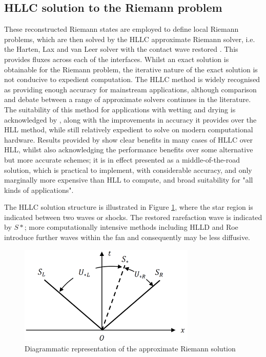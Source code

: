 \subsection{HLLC solution to the Riemann problem}

These reconstructed Riemann states are employed to define local Riemann problems, which are then solved by the HLLC approximate Riemann solver, i.e. the Harten, Lax and van Leer solver with the contact wave restored \citep{Toro1994}. This provides fluxes across each of the interfaces. Whilst an exact solution is obtainable for the Riemann problem, the iterative nature of the exact solution is not conducive to expedient computation. The HLLC method is widely recognised as providing enough accuracy for mainstream applications, although comparison and debate between a range of approximate solvers continues in the literature. The suitability of this method for applications with wetting and drying is acknowledged by \citet{Liu2013}, along with the improvements in accuracy it provides over the HLL method, while still relatively expedient to solve on modern computational hardware. Results provided by \citet{Erduran2002} show clear benefits in many cases of HLLC over HLL, whilst also acknowledging the performance benefits over some alternative but more accurate schemes; it is in effect presented as a middle-of-the-road solution, which is practical to implement, with considerable accuracy, and only marginally more expensive than HLL to compute, and broad suitability for "all kinds of applications".

The HLLC solution structure is illustrated in Figure \ref{RiemannProblem}, where the star region is indicated between two waves or shocks. The restored rarefaction wave is indicated by $S*$; more computationally intensive methods including HLLD \citep{Mignone2009} and Roe \citep{Roe1981} introduce further waves within the fan and consequently may be less diffusive.

\begin{figure}[tpb]
\centering
\includegraphics[width=0.75\textwidth]{numerical-scheme-figures/riemann-problem.png}
\caption{Diagrammatic representation of the approximate Riemann solution}
\label{RiemannProblem}
\end{figure}

